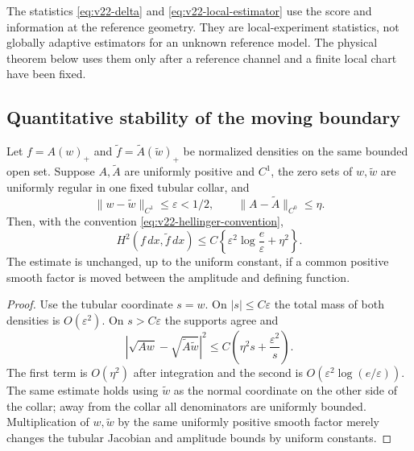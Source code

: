 \begin{remark}
The statistics \eqref{eq:v22-delta} and \eqref{eq:v22-local-estimator} use the
score and information at the reference geometry.  They are local-experiment
statistics, not globally adaptive estimators for an unknown reference model.
The physical theorem below uses them only after a reference channel and a
finite local chart have been fixed.
\end{remark}

\subsection{Quantitative stability of the moving boundary}

\begin{lemma}
\label{lem:v22-hypersurface-stability}
Let $f=A(w)_+$ and $\widetilde f=\widetilde A(\widetilde w)_+$ be normalized
densities on the same bounded open set.  Suppose $A,\widetilde A$ are
uniformly positive and $C^1$, the zero sets of $w,\widetilde w$ are uniformly
regular in one fixed tubular collar, and
\[
 \|w-\widetilde w\|_{C^1}\le\varepsilon<1/2,
 \qquad
 \|A-\widetilde A\|_{C^0}\le\eta.
\]
Then, with the convention \eqref{eq:v22-hellinger-convention},
\begin{equation}\label{eq:v22-hypersurface-stability}
 H^2(f\,dx,\widetilde f\,dx)
 \le C\left\{\varepsilon^2\log\frac e\varepsilon+\eta^2\right\}.
\end{equation}
The estimate is unchanged, up to the uniform constant, if a common positive
smooth factor is moved between the amplitude and defining function.
\end{lemma}

\begin{proof}
Use the tubular coordinate $s=w$.  On $|s|\le C\varepsilon$ the total mass of
both densities is $O(\varepsilon^2)$.  On $s>C\varepsilon$ the supports agree
and
\[
 |\sqrt{Aw}-\sqrt{\widetilde A\widetilde w}|^2
 \le C\left(\eta^2s+\frac{\varepsilon^2}{s}\right).
\]
The first term is $O(\eta^2)$ after integration and the second is
$O(\varepsilon^2\log(e/\varepsilon))$.  The same estimate holds using
$\widetilde w$ as the normal coordinate on the other side of the collar;
away from the collar all denominators are uniformly bounded.  Multiplication
of $w,\widetilde w$ by the same uniformly positive smooth factor merely
changes the tubular Jacobian and amplitude bounds by uniform constants.
\end{proof}

